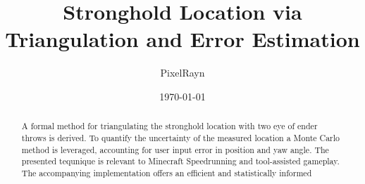 \documentclass[a4paper,10pt]{article}
\title{Stronghold Location via Triangulation and Error Estimation}
\author{PixelRayn}
\date{\today}
\begin{document}
\maketitle

\begin{abstract}
    A formal method for triangulating the stronghold location with two eye of ender throws is derived.
    To quantify the uncertainty of the measured location a Monte Carlo method is leveraged, accounting for user input error in position and yaw angle.
    The presented tequnique is relevant to Minecraft Speedrunning and tool-assisted gameplay. The accompanying implementation offers an efficient and statistically informed 
\end{abstract}


\end{document}
